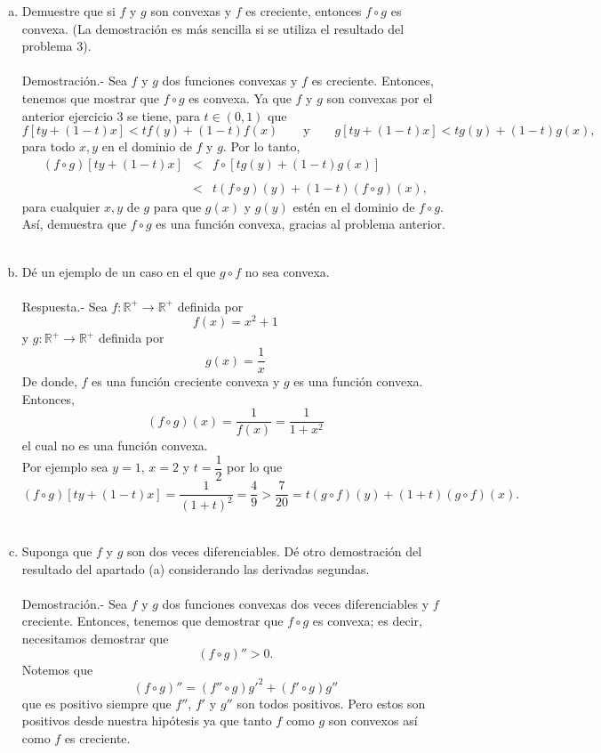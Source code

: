\begin{enumerate}[\bfseries 1.]
\begin{enumerate}[(a)]
	    \item Demuestre que si $f$ y $g$ son convexas y $f$ es creciente, entonces $f\circ g$ es convexa. (La demostración es más sencilla si se utiliza el resultado del problema 3).\\\\
		Demostración.-\; Sea $f$ y $g$ dos funciones convexas y $f$ es creciente. Entonces, tenemos que mostrar que $f\circ g$ es convexa. Ya que $f$ y $g$ son convexas por el anterior ejercicio 3 se tiene, para $t\in (0,1)$ que
		$$f\left[ty+(1-t)x\right]<tf(y)+(1-t)f(x)\qquad \mbox{y}\qquad g\left[ty+(1-t)x\right]<tg(y)+(1-t)g(x),$$
		para todo $x,y$ en el dominio de $f$ y $g$. Por lo tanto,
		$$
		\begin{array}{rcl}
		    (f\circ g)\left[ty+(1-t)x\right] &<& f\circ\left[tg(y)+(1-t)g(x)\right]\\\\
						   &<& t(f\circ g)(y)+(1-t)(f\circ g)(x),
		\end{array}
		$$
		para cualquier $x,y$ de $g$ para que $g(x)$ y $g(y)$ estén en el dominio de $f\circ g$. Así, demuestra que $f\circ g$ es una función convexa, gracias al problema anterior.\\\\


	    \item Dé un ejemplo de un caso en el que $g\circ f$ no sea convexa.\\\\
		Respuesta.-\; Sea $f:\mathbb{R}^+\to \mathbb{R}^+$ definida por
		$$f(x)=x^2+1$$
		y $g:\mathbb{R}^+\to \mathbb{R}^+$ definida por
		$$g(x)=\dfrac{1}{x}$$
		De donde, $f$ es una función creciente convexa y $g$ es una función convexa. Entonces, 
		$$(f\circ g)(x)=\dfrac{1}{f(x)}=\dfrac{1}{1+x^2}$$
		el cual no es una función convexa. \\

		Por ejemplo sea $y=1$, $x=2$ y $t=\dfrac{1}{2}$ por lo que
		$$(f\circ g)\left[ty+(1-t)x\right]=\dfrac{1}{(1+t)^2}=\dfrac{4}{9}>\dfrac{7}{20}=t(g\circ f)(y)+(1+t)(g\circ f)(x).$$\\

	    \item Suponga que $f$ y $g$ son dos veces diferenciables. Dé otro demostración del resultado del apartado (a) considerando las derivadas segundas.\\\\
		Demostración.-\; Sea $f$ y $g$ dos funciones convexas dos veces diferenciables y $f$ creciente. Entonces, tenemos que demostrar que $f\circ g$ es convexa; es decir, necesitamos demostrar que 
		$$(f\circ g)''>0.$$
		Notemos que 
		$$(f\circ g)''=(f''\circ g)g'^2+(f'\circ g)g''$$
		que es positivo siempre que $f''$, $f'$ y $g''$ son todos positivos. Pero estos son positivos desde nuestra hipótesis ya que tanto $f$ como $g$ son convexos así como $f$ es creciente.\\\\
	\end{enumerate}


\end{enumerate}
